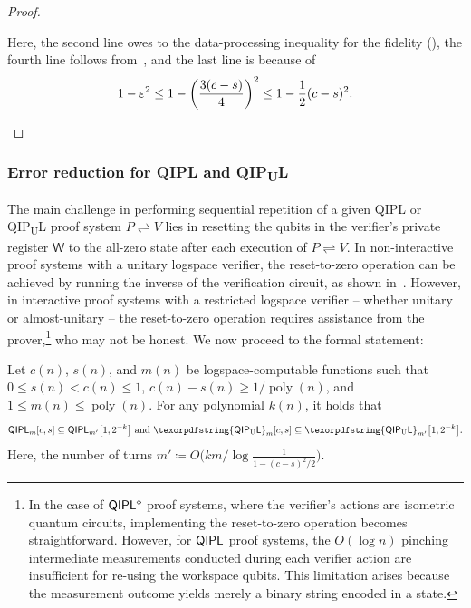 \documentclass[11pt, a4paper]{article}
\numberwithin{equation}{section}
\numberwithin{figure}{section}
\newcommand{\QIPL}{\textnormal{\textsf{QIPL}}\xspace}
\newcommand{\QIPUL}{\texorpdfstring{\textnormal{\textsf{QIP}\textsubscript{\textnormal{U}}\textsf{L}}}\xspace}
\newcommand{\protocol}[2]{{#1}\!\rightleftharpoons\!{#2}}
\DeclarePairedDelimiter\rbra{\lparen}{\rparen}
\DeclareMathOperator\poly{poly}
\newcommand{\sfW}{\mathsf{W}}
\begin{document}
\begin{proof}
\begin{itemize}[leftmargin=2em]
        Here, the second line owes to the data-processing inequality for the fidelity (), the fourth line follows from~\cite[Equation (4.25)]{VW16}, and the last line is because of 
        \[1-\varepsilon^2 \leq 1 - \rbra*{\frac{3(c-s)}{4}}^2 \leq 1 - \frac{1}{2}(c-s)^2. \qedhere\]
    \end{itemize}

\end{proof}

\subsubsection{Error reduction for \QIPL{} and \QIPUL{}}

The main challenge in performing sequential repetition of a given \QIPL{} or \QIPUL{} proof system $\protocol{P}{V}$ lies in resetting the qubits in the verifier's private register $\sfW$ to the all-zero state after each execution of $\protocol{P}{V}$. 
In non-interactive proof systems with a unitary logspace verifier, the reset-to-zero operation can be achieved by running the inverse of the verification circuit, as shown in~\cite{MW05,FKLMN16}. However, in interactive proof systems with a restricted logspace verifier -- whether unitary or almost-unitary -- the reset-to-zero operation requires assistance from the prover,\footnote{In the case of $\QIPL{}^\diamond$ proof systems, where the verifier's actions are isometric quantum circuits, implementing the reset-to-zero operation becomes straightforward. However, for $\QIPL{}$ proof systems, the $O(\log{n})$ pinching intermediate measurements conducted during each verifier action are insufficient for re-using the workspace qubits. This limitation arises because the measurement outcome yields merely a binary string encoded in a state.} who may not be honest.
We now proceed to the formal statement:

\begin{lemma}[Error reduction for \QIPL{} and \QIPUL{}]
    \label{lemma:QIPL-error-reduction}
    Let $c(n)$, $s(n)$, and $m(n)$ be logspace-computable functions such that $0 \leq s(n) < c(n) \leq 1$, $c(n) - s(n) \geq 1/\poly(n)$, and $1 \leq m(n) \leq \poly(n)$. For any polynomial $k(n)$, it holds that
    \[ \QIPL_m[c,s] \subseteq \QIPL_{m'}\big[1, 2^{-k}\big] \text{ and } \QIPUL_m[c,s] \subseteq \QIPUL_{m'}\big[1, 2^{-k}\big]. \]
    Here, the number of turns $m' \coloneqq O\big(km/\log\frac{1}{1-(c-s)^2/2}\big)$.
\end{lemma}
\end{document}
